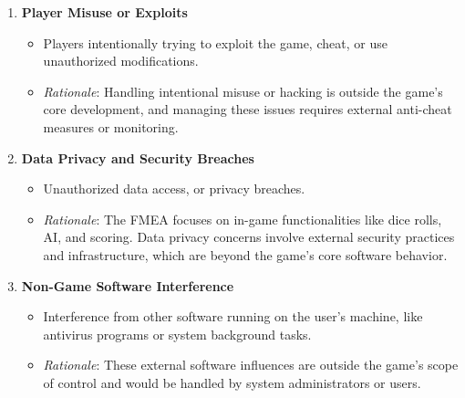 \documentclass{article}
\begin{document}
\begin{enumerate}
    \item \textbf{Player Misuse or Exploits}
        \begin{itemize}
            \item Players intentionally trying to exploit the game, cheat, or use unauthorized modifications.
            \item \textit{Rationale}: Handling intentional misuse or hacking is outside the game's core development, and managing these issues requires external anti-cheat measures or monitoring.
        \end{itemize}

    \item \textbf{Data Privacy and Security Breaches}
        \begin{itemize}
            \item Unauthorized data access, or privacy breaches.
            \item \textit{Rationale}: The FMEA focuses on in-game functionalities like dice rolls, AI, and scoring. Data privacy concerns involve external security practices and infrastructure, which are beyond the game's core software behavior.
        \end{itemize}

    \item \textbf{Non-Game Software Interference}
        \begin{itemize}
            \item Interference from other software running on the user's machine, like antivirus programs or system background tasks.
            \item \textit{Rationale}: These external software influences are outside the game's scope of control and would be handled by system administrators or users.
        \end{itemize}

\end{enumerate}
\end{document}
